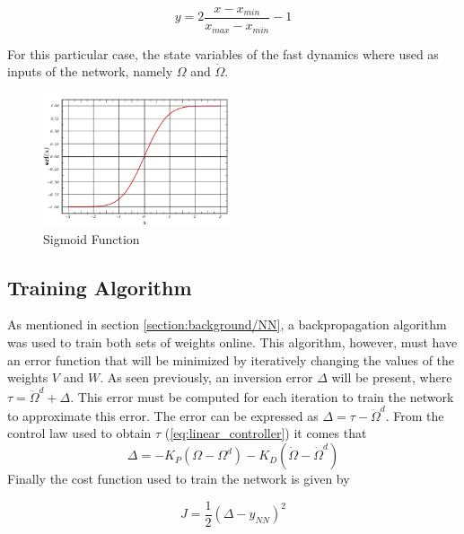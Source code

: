 \begin{equation}
y=2\dfrac{x-x_{min}}{x_{max}-x_{min}}-1
\label{eq:normalisation}
\end{equation}

For this  particular case, the state variables of the fast dynamics where used as inputs of the network, namely $\Omega$ and $\dot{\Omega}$.

\begin{figure}[!htb]
  \centering
  \includegraphics[width=0.5\textwidth]{Figures/sigmoid.png}
  \caption[Sigmoid Function]{Sigmoid Function}
  \label{fig:sigmoid}
\end{figure}

\subsection{Training Algorithm}

As mentioned in section \ref{section:background/NN}, a backpropagation algorithm was used to train both sets of weights online. This algorithm, however, must have an error function that will be minimized by iteratively changing the values of the weights $V$ and $W$. As seen previously, an inversion error $\Delta$ will be present, where $\tau = \ddot{\Omega}^d + \Delta$. This error must be computed for each iteration to train the network to approximate this error. The error can be expressed as $\Delta=\tau - \ddot{\Omega}^d$.
From the control law used to obtain $\tau$ (\ref{eq:linear_controller}) it comes that
\begin{equation}
\Delta = -K_P(\Omega-\Omega^d)-K_D(\dot{\Omega}-\dot{\Omega}^d)
\label{eq:inversion_error}
\end{equation}
Finally the cost function used to train the network is given by

\begin{equation}
J=\dfrac{1}{2}(\Delta-y_{NN})^2
\label{eq:NN_cost}
\end{equation}

